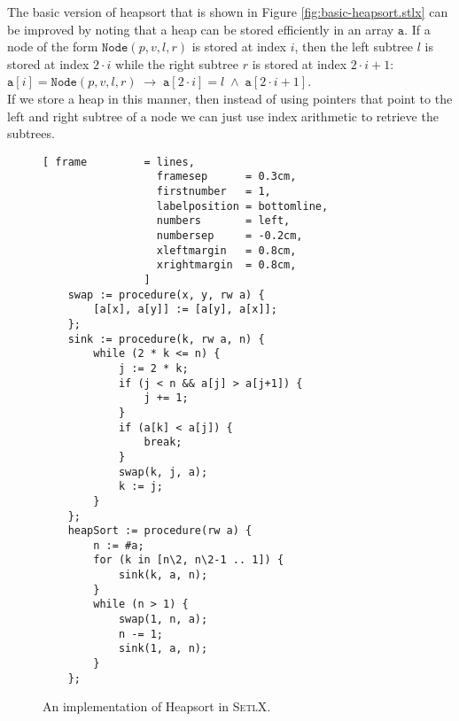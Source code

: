 The basic version of heapsort that is shown in Figure \ref{fig:basic-heapsort.stlx} can be improved
by noting that a heap can be stored efficiently in an array $\mathtt{a}$.  If a node of the form
$\mathtt{Node}(p, v, l, r)$ is stored at index $i$, then the left subtree $l$ is stored at
index $2 \cdot i$ while the right subtree $r$ is stored at index $2 \cdot i + 1$:
\\[0.2cm]
\hspace*{1.3cm}
$\mathtt{a}[i] = \mathtt{Node}(p, v, l, r) \;\rightarrow\; \mathtt{a}[2\cdot i] = l \;\wedge\; \mathtt{a}[2\cdot i+1]$.
\\[0.2cm]
If we store a heap in this manner, then instead of using pointers that point to the left and right
subtree of a node we can just use index arithmetic to retrieve the subtrees.  


 
\begin{figure}[!ht]
\centering
\begin{Verbatim}[ frame         = lines, 
                  framesep      = 0.3cm, 
                  firstnumber   = 1,
                  labelposition = bottomline,
                  numbers       = left,
                  numbersep     = -0.2cm,
                  xleftmargin   = 0.8cm,
                  xrightmargin  = 0.8cm,
                ]
    swap := procedure(x, y, rw a) {
        [a[x], a[y]] := [a[y], a[x]];
    };
    sink := procedure(k, rw a, n) {
        while (2 * k <= n) {
            j := 2 * k;
            if (j < n && a[j] > a[j+1]) {
                j += 1;
            }
            if (a[k] < a[j]) {
                break;
            }
            swap(k, j, a);
            k := j;
        }
    };
    heapSort := procedure(rw a) {
        n := #a;
        for (k in [n\2, n\2-1 .. 1]) {
            sink(k, a, n);
        }
        while (n > 1) {
            swap(1, n, a);
            n -= 1;
            sink(1, a, n);
        }
    };
\end{Verbatim}
\vspace*{-0.3cm}
\caption{An implementation of Heapsort in \textsc{SetlX}.}
\label{fig:heap-sort.stlx}
\end{figure}

